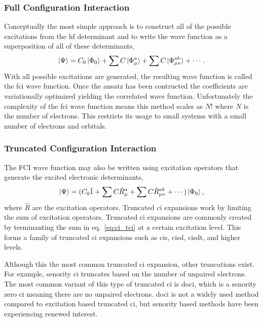 \subsubsection{Full Configuration Interaction}
Conceptually the most simple approach is to construct all of the possible excitations from the \gls{hf} determinant and to write the wave function as a superposition of all of these determinants,
\begin{equation}
\ket{\Psi} = C_0 \ket{\Phi_0} + \sum C \ket{\Phi_{\mu}^{a}} + \sum C \ket{\Phi_{\mu\nu}^{ab}} + \cdots.
\end{equation}
With all possible excitations are generated, the resulting wave function is called the \gls{fci} wave function.
Once the ansatz has been contructed the coefficients are variationally optimized yielding the correlated wave function.
Unfortunately the complexity of the \gls{fci} wave function means this method scales as $N!$ where $N$ is the number of electrons.
This restricts its usage to small systems with a small number of electrons and orbitals.

\subsubsection{Truncated Configuration Interaction}
The FCI wave function may also be written using excitation operators that generate the excited electronic determinants,
\begin{equation}
    \ket{\Psi} = (C_0 \hat{1} + \sum C \hat{R}_{\mu}^{a} + \sum C \hat{R}_{\mu\nu}^{ab} + \cdots )\ket{\Phi_0},
    \label{eq:ci_tci}
\end{equation}
where $\hat{R}$ are the excitation operators.
Truncated \gls{ci} expansions work by limiting the sum of excitation operators.
Truncated \gls{ci} expansions are commonly created by terminanting the sum in eq.~\ref{eq:ci_tci} at a certain excitation level.
This forms a family of truncated \gls{ci} expansions such as \gls{cis}, \gls{cisd}, \gls{cisdt}, and higher levels.

Although this the most common truncated \gls{ci} expansion, other truncations exist.
For example, senority \gls{ci} truncates based on the number of unpaired electrons.
The most common variant of this type of truncated \gls{ci} is \gls{doci}, which is a senority zero \gls{ci} meaning there are no unpaired electrons.
\gls{doci} is not a widely used method compared to excitation based truncated \gls{ci}, but senority based methods have been experiencing renewed interest.

